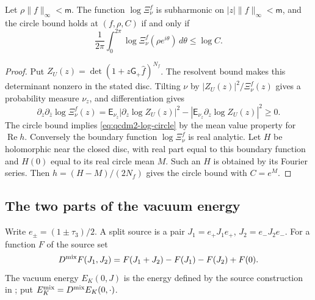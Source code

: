 \documentclass[11pt,letterpaper,reqno]{amsart}
\makeatletter
\theoremstyle{definition}
\newcommand{\ms@minorstart}{%
  \pushQED{\qed}\renewcommand{\qedsymbol}{$\blacksquare$}}
\newenvironment{lemma}[1][]{\ms@minorstart\ms@lemma[#1]}
  {\popQED\endms@lemma}
\theoremstyle{remark}
\makeatother
\begin{document}
\begin{lemma}\label{C-415-16}
Let $\rho\|f\|_\infty<\mathsf m$.  The function
$\log\Xi_\nu^f$ is subharmonic on
$|z|\|f\|_\infty<\mathsf m$, and the circle bound holds at
$(f,\rho,C)$ if and only if
\begin{equation}\label{eq:qcdm2-log-circle}
 \frac1{2\pi}\int_0^{2\pi}
       \log\Xi_\nu^f(\rho e^{i\theta})\,d\theta\le\log C.
\end{equation}
\end{lemma}

\begin{proof}
Put $Z_U(z)=\det(1+z\mathsf G_+\hat f)^{N_f}$.
The resolvent bound makes this determinant nonzero in the stated
disc.  Tilting $\nu$ by $|Z_U(z)|^2/\Xi_\nu^f(z)$ gives a probability
measure $\nu_z$, and differentiation gives
\[
 \partial_z\partial_{\bar z}\log\Xi_\nu^f(z)
 =\mathsf E_{\nu_z}|\partial_z\log Z_U(z)|^2
    -|\mathsf E_{\nu_z}\partial_z\log Z_U(z)|^2\ge0.
\]
The circle bound implies \eqref{eq:qcdm2-log-circle} by the mean
value property for $\operatorname{Re}h$.  Conversely the boundary
function $\log\Xi_\nu^f$ is real analytic.  Let $H$ be holomorphic
near the closed disc, with real part equal to this boundary
function and $H(0)$ equal to its real circle mean $M$.  Such an
$H$ is obtained by its Fourier series.  Then
$h=(H-M)/(2N_f)$ gives the circle bound with $C=e^M$.
\end{proof}

\subsection{The two parts of the vacuum energy}

Write $e_\pm=(1\pm\tau_3)/2$.  A split source is a pair
$J_1=e_+J_1e_+$, $J_2=e_-J_2e_-$.  For a function $F$ of the
source set
\begin{equation}\label{C-415-2}
 D^{\rm mix}F(J_1,J_2)
 =F(J_1+J_2)-F(J_1)-F(J_2)+F(0).
\end{equation}
The vacuum energy $E_K(0,J)$ is the energy defined by the source
construction in \cite[Prop. 10.6]{QCDM1}; put
$E_K^{\rm mix}=D^{\rm mix}E_K(0,\cdot)$.
\end{document}
